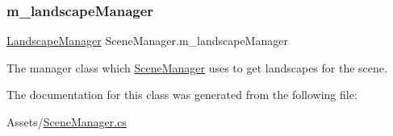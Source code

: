 \subsubsection{\texorpdfstring{m\+\_\+landscape\+Manager}{m\_landscapeManager}}
{\footnotesize\ttfamily \hyperlink{class_landscape_manager}{Landscape\+Manager} Scene\+Manager.\+m\+\_\+landscape\+Manager\hspace{0.3cm}{\ttfamily [private]}}



The manager class which \hyperlink{class_scene_manager}{Scene\+Manager} uses to get landscapes for the scene. 



The documentation for this class was generated from the following file\+:\begin{DoxyCompactItemize}
\item 
Assets/\hyperlink{_scene_manager_8cs}{Scene\+Manager.\+cs}\end{DoxyCompactItemize}
